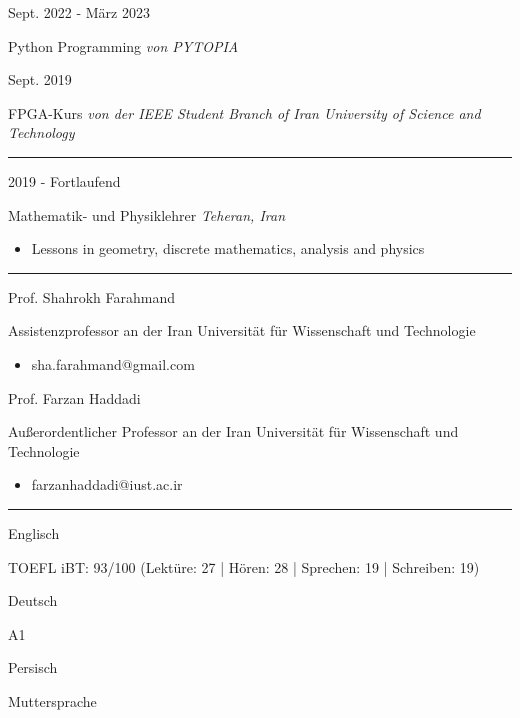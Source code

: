 \documentclass[a4paper,10pt]{article}
\newlength{\cvcolumngapwidth}
\newlength{\cvleftcolumnwidth}
\newlength{\cvrightcolumnwidth}
\newcommand{\cvsectionstyle}[1]{{\normalsize\cvsectionfont\textcolor{cvsectioncolor}{#1}}}
\newcommand{\cvtitlestyle}[1]{{\large\cvtitlefont\textcolor{cvtitlecolor}{#1}}}
\newcommand{\cvdurationstyle}[1]{{\small\cvdurationfont\textcolor{cvdurationcolor}{#1}}}
\newcommand{\cvheadingstyle}[1]{{\normalsize\cvheadingfont\textcolor{cvheadingcolor}{#1}}}
\newlength{\cvafteritemskipamount}
\newlength{\cvaftersectionskipamount}
\newlength{\cvbetweensectionandheadingextraskipamount}
\newlength{\cvaftertitleskipamount}
\newlength{\cvparskip}
\newcommand{\cvsection}[1]{
    \begin{minipage}[t]{\cvleftcolumnwidth}
        \raggedleft\cvsectionstyle{#1}
    \end{minipage}%
    \hspace{\cvcolumngapwidth}%
    \begin{minipage}[t]{\cvrightcolumnwidth}
        \textcolor{cvrulecolor}{\rule{\cvrightcolumnwidth}{0.3mm}}
    \end{minipage}

    \vspace{\cvaftersectionskipamount}
}
\newcommand{\cvitem}[2]{
    \begin{minipage}[t]{\cvleftcolumnwidth}
        \raggedleft #1
    \end{minipage}%
    \hspace{\cvcolumngapwidth}%
    \begin{minipage}[t]{\cvrightcolumnwidth}
        \setlength{\parskip}{\cvparskip} #2
    \end{minipage}

    \vspace{\cvafteritemskipamount}
}
\newcommand{\cvtitle}[1]{
    \cvtitlestyle{#1}

    \vspace{\cvaftertitleskipamount}
    \vspace{-\cvparskip}
}
\begin{document}
\vspace{-4mm}
\cvitem{
    \cvdurationstyle{Sept. 2022 - März 2023}
}{
    \cvtitle{{Python Programming} \textit{\small{von PYTOPIA}}}
}

\vspace{-4mm}
\cvitem{
    \cvdurationstyle{Sept. 2019}
}{
    \cvtitle{{FPGA-Kurs} \textit{\small{von der IEEE Student Branch of Iran University of Science and Technology}}}
}

\cvsection{FREIWILLIGENARBEIT}
\cvitem{
    \cvdurationstyle{2019 - Fortlaufend}
}{
    \cvtitle{{Mathematik- und Physiklehrer} \hfill{\textnormal{\textit{Teheran, Iran}}}}
    {}
    \begin{itemize}[leftmargin=*]
        \item Lessons in geometry, discrete mathematics, analysis and physics
    \end{itemize}
}

\cvsection{VERWEISE}
\vspace{\cvbetweensectionandheadingextraskipamount}
\cvitem{
    \cvheadingstyle{Prof. Shahrokh Farahmand}
}{
    {Assistenzprofessor an der Iran Universität für Wissenschaft und Technologie}
    \begin{itemize}[leftmargin=*]
        \item sha.farahmand@gmail.com
    \end{itemize}
}
\vspace{-4mm}
\cvitem{
    \cvheadingstyle{Prof. Farzan Haddadi}
}{
    {Außerordentlicher Professor an der Iran Universität für Wissenschaft und Technologie}
    \begin{itemize}[leftmargin=*]
        \item farzanhaddadi@iust.ac.ir
    \end{itemize}
}

\cvsection{SPRACHEN}
\vspace{\cvbetweensectionandheadingextraskipamount}
\cvitem{
    \cvheadingstyle{Englisch}
}{
    {TOEFL iBT: 93/100 (Lektüre: 27 | Hören: 28 | Sprechen: 19 | Schreiben: 19)}
}
\vspace{-4mm}
\cvitem{
    \cvheadingstyle{Deutsch}
}{
    A1

}
\vspace{-4mm}
\cvitem{
    \cvheadingstyle{Persisch}
}{
    Muttersprache

}
\end{document}
